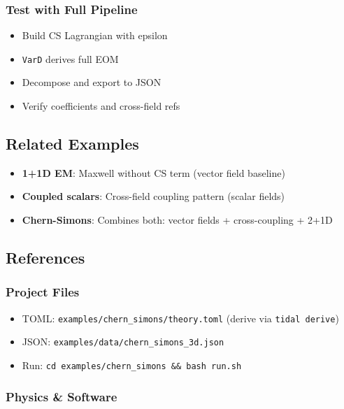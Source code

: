 \subsubsection{Test with Full Pipeline}
\label{sec:cs-future-test}

\begin{itemize}
  \item Build CS Lagrangian with epsilon
  \item \texttt{VarD} derives full EOM
  \item Decompose and export to JSON
  \item Verify coefficients and cross-field refs
\end{itemize}

\subsection{Related Examples}
\label{sec:cs-related}

\begin{itemize}
  \item \textbf{1+1D EM}: Maxwell without CS term (vector field baseline)
  \item \textbf{Coupled scalars}: Cross-field coupling pattern (scalar fields)
  \item \textbf{Chern-Simons}: Combines both: vector fields + cross-coupling + 2+1D
\end{itemize}

\subsection{References}
\label{sec:cs-references}

\subsubsection{Project Files}
\label{sec:cs-project-files}

\begin{itemize}
  \item TOML: \texttt{examples/chern\_simons/theory.toml} (derive via \texttt{tidal derive})
  \item JSON: \texttt{examples/data/chern\_simons\_3d.json}
  \item Run: \texttt{cd examples/chern\_simons \&\& bash run.sh}
\end{itemize}

\subsubsection{Physics \& Software}
\label{sec:cs-physics-refs}

